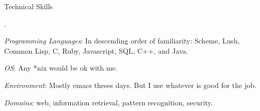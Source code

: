 \begin{rubric}{Technical Skills}{

  .

  
  \entry* \emph{Programming Languages}: In descending order of
  familiarity: Scheme, Lush, Common Lisp, C, Ruby,
  Javascript, SQL, C++, and Java.
  
  \entry* \emph{OS}: Any *nix would be ok with me.

  \entry* \emph{Environment}: Mostly emacs theses days. But I use
  whatever is good for the job.

  \entry* \emph{Domains}: web, information retrieval, pattern
  recognition, security.
  
}\end{rubric}
